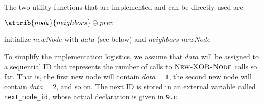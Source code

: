 \newpage

The two utility functions that are implemented and can be directly used are
\begin{codebox}
\li \Return $\attrib{node}{neighbors} \oplus prev$
\End
\end{codebox}

\begin{codebox}
\li initialize $newNode$ with $data$ (see below) and $neighbors$
\li \Return $newNode$
\End
\end{codebox}

To simplify the implementation logistics, we assume that $data$ will be assigned to a sequential ID that represents the number of calls to $\textsc{New-XOR-Node}$ calls so far. That is, the first new node will contain $data = 1$, the second new node will contain $data = 2$, and so on. The next ID is stored in an external variable called \texttt{next\_node\_id}, whose actual declaration is given in \texttt{9.c}.

